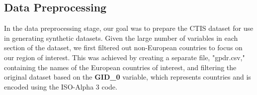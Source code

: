 

\subsection{Data Preprocessing}
\label{subsec:preprocess}
In the data preprocessing stage, our goal was to prepare the CTIS dataset for use in generating synthetic datasets. Given the large number of variables in each section of the dataset, we first filtered out non-European countries to focus on our region of interest. This was achieved by creating a separate file, "gpdr.csv," containing the names of the European countries of interest, and filtering the original dataset based on the \textbf{GID\_0} variable, which represents countries and is encoded using the ISO-Alpha 3 code.


